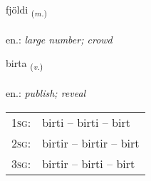 \documentclass[frontgrid, backgrid]{flacards}\usepackage[]{graphicx}\usepackage[]{xcolor}
\begin{document}
\renewcommand{\flhead}{\vskip5pt \fboxsep=0pt {\small\bfseries\footnotesize Nafnorð | Noun}}
\renewcommand{\fcfoot}{\vskip5pt \fboxsep=0pt \hspace{2pt}{\small\bfseries\footnotesize 1K}}

\renewcommand{\blhead}{\vskip5pt {\small\bfseries\footnotesize Nafnorð | Noun }}
\renewcommand{\bcfoot}{\vskip5pt \hspace{2pt}{\small\bfseries\footnotesize 1K}}


{fjöldi \small{\textsubscript{(\textit{m.})}} \\[1ex] %
\textphonetic{[fjœltɪ]} \\
en.: \emph{large number; crowd} \\  [2ex]
\renewcommand*{\arraystretch}{0.8}
}

\renewcommand{\flhead}{\vskip5pt \fboxsep=0pt {\small\bfseries\footnotesize Sagnorð | Verb}}
\renewcommand{\fcfoot}{\vskip5pt \fboxsep=0pt \hspace{2pt}{\small\bfseries\footnotesize 1K}}

\renewcommand{\blhead}{\vskip5pt {\small\bfseries\footnotesize Sagnorð | Verb }}
\renewcommand{\bcfoot}{\vskip5pt \hspace{2pt}{\small\bfseries\footnotesize 1K}}


{birta \small{\textsubscript{(\textit{v.})}} \\[1ex] %
\textphonetic{[pɪr̥ta]} \\
en.: \emph{publish; reveal} \\  [2ex]
\renewcommand*{\arraystretch}{0.8}
\begin{tabular}{p{1cm}l}
\textsc{1sg}: & birti -- birti -- birt \\ 
\textsc{2sg}: & birtir -- birtir -- birt \\ 
\textsc{3sg}: & birtir -- birti -- birt \\ 
\end{tabular}
}
\end{document}
